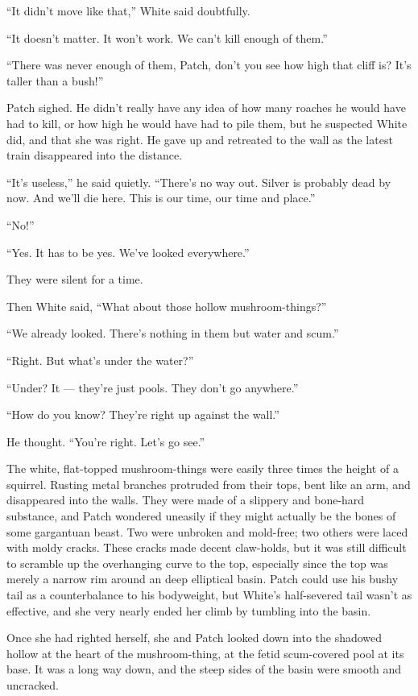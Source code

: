 \documentclass[12pt]{memoir}
\begin{document}
“It didn’t move like that,” White said doubtfully.

“It doesn’t matter. It won’t work. We can’t kill enough of them.”

“There was never enough of them, Patch, don’t you see how high that
cliff is? It’s taller than a bush!”

Patch sighed. He didn’t really have any idea of how many roaches he
would have had to kill, or how high he would have had to pile them,
but he suspected White did, and that she was right. He gave up and
retreated to the wall as the latest train disappeared into the
distance.

“It’s useless,” he said quietly. “There’s no way out. Silver is
probably dead by now. And we’ll die here. This is our time, our time
and place.”

“No!”

“Yes. It has to be yes. We’ve looked everywhere.”

They were silent for a time.

Then White said, “What about those hollow mushroom-things?”

“We already looked. There’s nothing in them but water and scum.”

“Right. But what’s under the water?”

“Under? It — they’re just pools. They don’t go anywhere.”

“How do you know? They’re right up against the wall.”

He thought. “You’re right. Let’s go see.”

The white, flat-topped mushroom-things were easily three times the
height of a squirrel. Rusting metal branches protruded from their
tops, bent like an arm, and disappeared into the walls. They were made
of a slippery and bone-hard substance, and Patch wondered uneasily if
they might actually be the bones of some gargantuan beast. Two were
unbroken and mold-free; two others were laced with moldy cracks. These
cracks made decent claw-holds, but it was still difficult to scramble
up the overhanging curve to the top, especially since the top was
merely a narrow rim around an deep elliptical basin. Patch could use
his bushy tail as a counterbalance to his bodyweight, but White’s
half-severed tail wasn’t as effective, and she very nearly ended her
climb by tumbling into the basin.

Once she had righted herself, she and Patch looked down into the
shadowed hollow at the heart of the mushroom-thing, at the fetid
scum-covered pool at its base. It was a long way down, and the steep
sides of the basin were smooth and uncracked.
\end{document}
